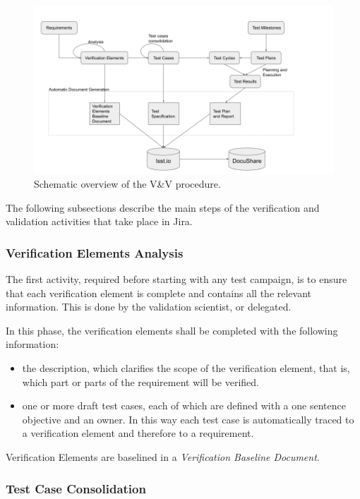 \begin{figure}
\begin{center}
\includegraphics[width=\textwidth]{imgs/VandVprocedure.png}
 \caption{Schematic overview of the V\&V procedure.}
 \label{fig:vandvproc}
\end{center}
\end{figure}

The following subsections describe the main steps of the verification and validation activities that take place in Jira.


\subsubsection{Verification Elements Analysis}

The first activity, required before starting with any test campaign, is to ensure that each verification element 
is complete and contains all the relevant information.
This is done by the validation scientist, or delegated.

In this phase, the verification elements shall be completed with the following information:
\begin{itemize}
\item the description, which clarifies the scope of the verification element, that is, which part or parts of the requirement will be verified.
\item one or more draft test cases, each of which are defined with a one sentence objective and an owner. 
In this way each test case is automatically traced to a verification element and therefore to a requirement.
\end{itemize}
Verification Elements are baselined in a \textit{Verification Baseline Document}.


\subsubsection{Test Case Consolidation}


